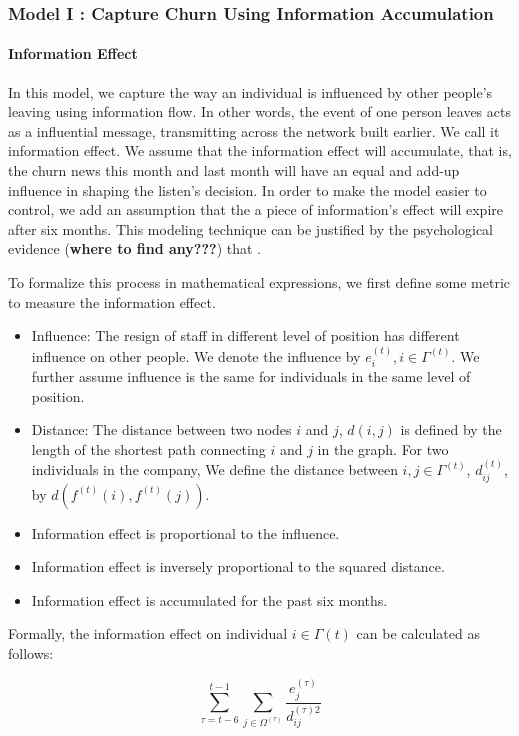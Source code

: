 \documentclass[tcn = 37075, sheet = true, abstract = true]{mcmthesis}
\begin{document}
\subsubsection{Model I : Capture Churn Using Information Accumulation}

\paragraph{Information Effect}
In this model, we capture the way an individual is influenced by other people's leaving using information flow. In other words, the event of one person leaves acts as a influential message, transmitting across the network built earlier. We call it information effect. We assume that the information effect will accumulate, that is, the churn news this month and last month will have an equal and add-up influence in shaping the listen's decision. In order to make the model easier to control, we add an assumption that the a piece of information's effect will expire after six months. This modeling technique can be justified by the psychological evidence (\textbf{where to find any???}) that . 

To formalize this process in mathematical expressions, we first define some metric to measure the information effect. 

\begin{itemize}
\item Influence: The resign of staff in different level of position has different influence on other people. We denote the influence by $e^{(t)}_i,i\in \Gamma^{(t)}$. We further assume influence is the same for individuals in the same level of position.
\item Distance: The distance between two nodes $i$ and $j$, $d(i,j)$ is defined by the length of the shortest path connecting $i$ and $j$ in the graph. For two individuals in the company, We define the distance between $i, j\in  \Gamma^{(t)}$, $d_{ij}^{(t)}$, by $d(f^{(t)}(i),f^{(t)}(j))$.
\item Information effect is proportional to the influence.
\item Information effect is inversely proportional to the squared distance.
\item Information effect is accumulated for the past six months.
\end{itemize}

Formally, the information effect on individual $i\in \Gamma{(t)}$ can be calculated as follows:

$$\displaystyle \sum_{\tau=t-6}^{t-1}\sum_{j\in \Omega^{(\tau)}}\frac{e_j^{(\tau)}}{d_{ij}^{(\tau)2}}$$
\end{document}

